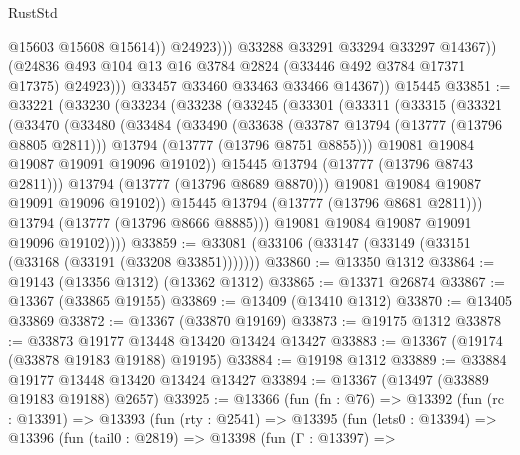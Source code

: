 \begin{lexlean}{RustStd}
\begin{coremodule}
                          @15603
                          @15608
                          @15614))
                      @24923)))
                @33288
                @33291
                @33294
                @33297
                @14367))
            (@24836 @493 @104 @13 @16 @3784 @2824 (@33446 @492 @3784 @17371 @17375) @24923)))
        @33457
        @33460
        @33463
        @33466
        @14367))
    @15445
@33851 := @33221
    (@33230
      (@33234
        (@33238
          (@33245
            (@33301
              (@33311
                (@33315
                  (@33321
                    (@33470
                      (@33480
                        (@33484
                          (@33490
                            (@33638
                              (@33787 @13794 (@13777 (@13796 @8805 @2811)))
                              @13794
                              (@13777 (@13796 @8751 @8855)))
                            @19081
                            @19084
                            @19087
                            @19091
                            @19096
                            @19102))
                        @15445
                        @13794
                        (@13777 (@13796 @8743 @2811)))
                      @13794
                      (@13777 (@13796 @8689 @8870)))
                    @19081
                    @19084
                    @19087
                    @19091
                    @19096
                    @19102))
                @15445
                @13794
                (@13777 (@13796 @8681 @2811)))
              @13794
              (@13777 (@13796 @8666 @8885)))
            @19081
            @19084
            @19087
            @19091
            @19096
            @19102))))
@33859 := @33081 (@33106 (@33147 (@33149 (@33151 (@33168 (@33191 (@33208 @33851)))))))
@33860 := @13350 @1312
@33864 := @19143 (@13356 @1312) (@13362 @1312)
@33865 := @13371 @26874
@33867 := @13367 (@33865 @19155)
@33869 := @13409 (@13410 @1312)
@33870 := @13405 @33869
@33872 := @13367 (@33870 @19169)
@33873 := @19175 @1312
@33878 := @33873 @19177 @13448 @13420 @13424 @13427
@33883 := @13367 (@19174 (@33878 @19183 @19188) @19195)
@33884 := @19198 @1312
@33889 := @33884 @19177 @13448 @13420 @13424 @13427
@33894 := @13367 (@13497 (@33889 @19183 @19188) @2657)
@33925 := @13366
    (fun (fn : @76) =>
    @13392
      (fun (rc : @13391) =>
      @13393
        (fun (rty : @2541) =>
        @13395
          (fun (lets0 : @13394) =>
          @13396
            (fun (tail0 : @2819) =>
            @13398
              (fun (Γ : @13397) =>

\end{coremodule}
\end{lexlean}
